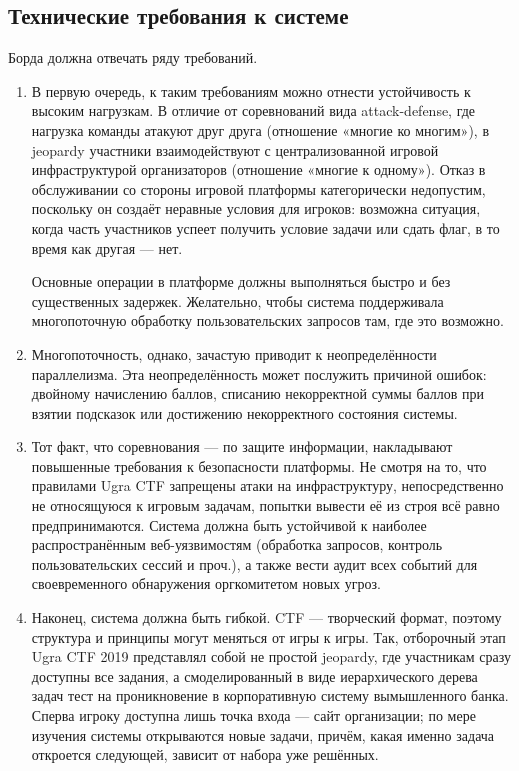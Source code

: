 \subsection{Технические требования к системе}

Борда должна отвечать ряду требований.

\begin{enumerate}

\item
В первую очередь, к таким требованиям можно отнести устойчивость к высоким нагрузкам. В отличие от соревнований вида attack-defense, где нагрузка команды атакуют друг друга (отношение «многие ко многим»), в jeopardy участники взаимодействуют с централизованной игровой инфраструктурой организаторов (отношение «многие к одному»). Отказ в обслуживании со стороны игровой платформы категорически недопустим, поскольку он создаёт неравные условия для игроков: возможна ситуация, когда часть участников успеет получить условие задачи или сдать флаг, в то время как другая --- нет.

Основные операции в платформе должны выполняться быстро и без существенных задержек. Желательно, чтобы система поддерживала многопоточную обработку пользовательских запросов там, где это возможно.

\item
Многопоточность, однако, зачастую приводит к неопределённости параллелизма. Эта неопределённость может послужить причиной ошибок: двойному начислению баллов, списанию некорректной суммы баллов при взятии подсказок или достижению некорректного состояния системы.


\item
Тот факт, что соревнования --- по защите информации, накладывают повышенные требования к безопасности платформы. Не смотря на то, что правилами Ugra CTF запрещены атаки на инфраструктуру, непосредственно не относящуюся к игровым задачам, попытки вывести её из строя всё равно предпринимаются. Система должна быть устойчивой к наиболее распространённым веб-уязвимостям (обработка запросов, контроль пользовательских сессий и проч.), а также вести аудит всех событий для своевременного обнаружения оргкомитетом новых угроз.

\item
Наконец, система должна быть гибкой. CTF --- творческий формат, поэтому структура и принципы могут меняться от игры к игры. Так, отборочный этап Ugra CTF 2019 представлял собой не простой jeopardy, где участникам сразу доступны все задания, а смоделированный в виде иерархического дерева задач тест на проникновение в корпоративную систему вымышленного банка. Сперва игроку доступна лишь точка входа --- сайт организации; по мере изучения системы открываются новые задачи, причём, какая именно задача откроется следующей, зависит от набора уже решённых\cite{UgraCTF19Q}.
\end{enumerate}


